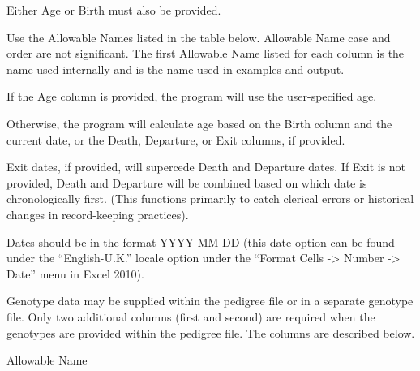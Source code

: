 \documentclass[]{article}
\begin{document}
Either Age or Birth must also be provided.

Use the Allowable Names listed in the table below. Allowable Name case
and order are not significant. The first Allowable Name listed for each
column is the name used internally and is the name used in examples and
output.

If the Age column is provided, the program will use the user-specified
age.

Otherwise, the program will calculate age based on the Birth column and
the current date, or the Death, Departure, or Exit columns, if provided.

Exit dates, if provided, will supercede Death and Departure dates. If
Exit is not provided, Death and Departure will be combined based on
which date is chronologically first. (This functions primarily to catch
clerical errors or historical changes in record-keeping practices).

Dates should be in the format YYYY-MM-DD (this date option can be found
under the ``English-U.K.'' locale option under the ``Format Cells
-\textgreater{} Number -\textgreater{} Date'' menu in Excel 2010).

Genotype data may be supplied within the pedigree file or in a separate
genotype file. Only two additional columns (first and second) are
required when the genotypes are provided within the pedigree file. The
columns are described below.

Allowable Name
\end{document}
